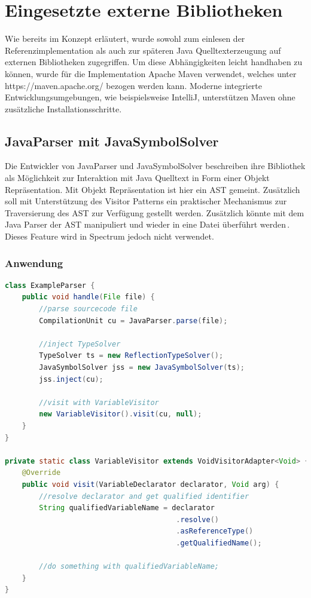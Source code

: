 \documentclass[12pt,oneside,a4paper,parskip]{scrbook}
\begin{document}
\section{Eingesetzte externe Bibliotheken}

Wie bereits im Konzept erläutert, wurde sowohl zum einlesen der Referenzimplementation als auch zur späteren Java Quelltexterzeugung auf externen Bibliotheken zugegriffen. Um diese Abhängigkeiten leicht handhaben zu können, wurde für die Implementation Apache Maven verwendet, welches unter https://maven.apache.org/ bezogen werden kann. Moderne integrierte Entwicklungsumgebungen, wie beispielsweise IntelliJ, unterstützen Maven ohne zusätzliche Installationsschritte.

\subsection{JavaParser mit JavaSymbolSolver}

Die Entwickler von JavaParser und JavaSymbolSolver beschreiben ihre Bibliothek als Möglichkeit zur Interaktion mit Java Quelltext in Form einer Objekt Repräsentation. Mit Objekt Repräsentation ist hier ein AST gemeint. Zusätzlich soll mit Unterstützung des Visitor Patterns ein praktischer Mechanismus zur Traversierung des AST zur Verfügung gestellt werden. Zusätzlich könnte mit dem Java Parser der AST manipuliert und wieder in eine Datei überführt werden\,\cite[S. 1]{javaparser2017}. Dieses Feature wird in Spectrum jedoch nicht verwendet.

\subsubsection{Anwendung}

\begin{lstlisting}[label=lst:jpVisit,
language=java,
firstnumber=1,
caption=Beispielhafte Initialisierung und Verwendung des JavaParsers und des JavaSymbolSolvers]
class ExampleParser {
	public void handle(File file) {
		//parse sourcecode file
		CompilationUnit cu = JavaParser.parse(file);
		
		//inject TypeSolver
		TypeSolver ts = new ReflectionTypeSolver();
		JavaSymbolSolver jss = new JavaSymbolSolver(ts);
		jss.inject(cu);
		
		//visit with VariableVisitor
		new VariableVisitor().visit(cu, null);
	}
}

private static class VariableVisitor extends VoidVisitorAdapter<Void> {
	@Override
	public void visit(VariableDeclarator declarator, Void arg) {
		//resolve declarator and get qualified identifier
		String qualifiedVariableName = declarator
										.resolve()
										.asReferenceType()
										.getQualifiedName();
		
		//do something with qualifiedVariableName;
	}
}
\end{lstlisting}
\end{document}
